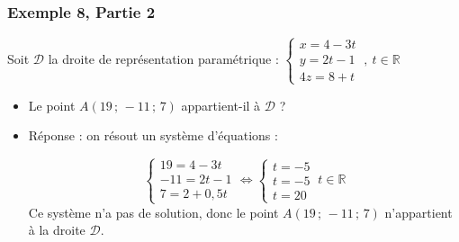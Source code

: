 \documentclass[xcolor=svgnames,t,final]{beamer}
\newcommand{\R}{\mathbb{R}}
\newcommand{\Coordesp}[3]{\left(#1\, ;\, #2\, ;\, #3\right)}
\begin{document}
\begin{frame}


\frametitle{Exemple 8, Partie 2}

Soit $\mathcal{D}$ la droite de représentation paramétrique : $\left\{\begin{array}{l} x=4-3t \\ y=2t-1 \\ 4z=8+t \end{array} \right.\ , \ t\in\R$


\begin{itemize}
 \item {\color{blue}  Le point $A\Coordesp{19}{-11}{7}$ appartient-il à $\mathcal{D}$ ?
}
\pause \item {\color{red} Réponse : on résout un système d'équations :  

$$\left\{\begin{array}{l} 19=4-3t \\ -11=2t-1 \\ 7=2+0,5t\end{array} \right. \Leftrightarrow  \left\{\begin{array}{l} t=-5 \\ t=-5 \\ t=20 \end{array} \right. \ t\in\R $$
Ce système n'a pas de solution, donc le point $A\Coordesp{19}{-11}{7}$  n'appartient à la droite $\mathcal{D}$.
}

\end{itemize}



\end{frame}
\end{document}
